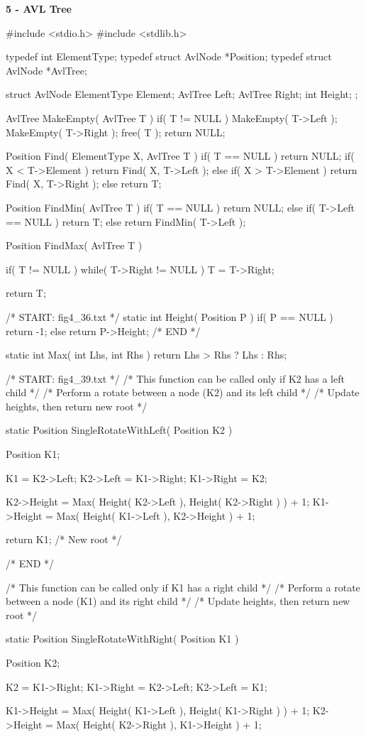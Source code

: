 \documentclass[12pt, a4paper]{article}
\begin{document}
\huge\textbf{5 - AVL Tree}
\begin{code}
#include <stdio.h>
#include <stdlib.h>

typedef int ElementType;
typedef struct AvlNode *Position;
typedef struct AvlNode *AvlTree;

struct AvlNode
{
	ElementType Element;
	AvlTree Left;
	AvlTree Right;
	int Height;
};

AvlTree MakeEmpty( AvlTree T )
{
	if( T != NULL )
	{
		MakeEmpty( T->Left );
		MakeEmpty( T->Right );
		free( T );
	}
	return NULL;
}

Position Find( ElementType X, AvlTree T )
{
	if( T == NULL ) return NULL;
	if( X < T->Element ) return Find( X, T->Left );
	else if( X > T->Element ) return Find( X, T->Right );
	else return T;
}

Position FindMin( AvlTree T )
{
	if( T == NULL ) return NULL;
	else if( T->Left == NULL ) return T;
	else return FindMin( T->Left );
}

Position FindMax( AvlTree T )
{
	if( T != NULL )
		while( T->Right != NULL )
			T = T->Right;

	return T;
}

/* START: fig4_36.txt */
static int Height( Position P )
{
	if( P == NULL ) return -1;
	else return P->Height;
}
/* END */

static int Max( int Lhs, int Rhs )
{
	return Lhs > Rhs ? Lhs : Rhs;
}

/* START: fig4_39.txt */
/* This function can be called only if K2 has a left child */
/* Perform a rotate between a node (K2) and its left child */
/* Update heights, then return new root */

static Position SingleRotateWithLeft( Position K2 )
{
	Position K1;

	K1 = K2->Left;
	K2->Left = K1->Right;
	K1->Right = K2;

	K2->Height = Max( Height( K2->Left ), Height( K2->Right ) ) + 1;
	K1->Height = Max( Height( K1->Left ), K2->Height ) + 1;

	return K1;  /* New root */
}
/* END */

/* This function can be called only if K1 has a right child */
/* Perform a rotate between a node (K1) and its right child */
/* Update heights, then return new root */

static Position SingleRotateWithRight( Position K1 )
{
	Position K2;

	K2 = K1->Right;
	K1->Right = K2->Left;
	K2->Left = K1;

	K1->Height = Max( Height( K1->Left ), Height( K1->Right ) ) + 1;
	K2->Height = Max( Height( K2->Right ), K1->Height ) + 1;

}
\end{code}
\end{document}
